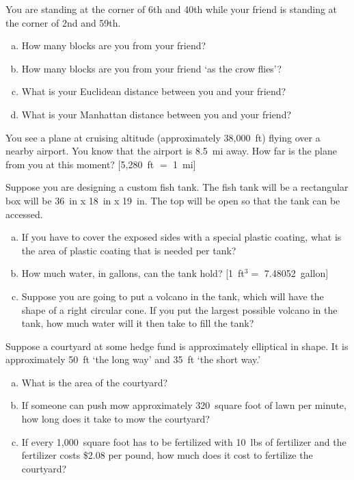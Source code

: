 \documentclass[11pt,letterpaper]{article}
\begin{document}

 You are standing at the corner of 6th and 40th while your friend is standing at the corner of 2nd and 59th.
	\begin{enumerate}[(a)]
	\item How many blocks are you from your friend?
	\item How many blocks are you from your friend `as the crow flies'?
	\item What is your Euclidean distance between you and your friend?
	\item What is your Manhattan distance between you and your friend?
	\end{enumerate}



\newpage



 You see a plane at cruising altitude (approximately 38,000~ft) flying over a nearby airport. You know that the airport is 8.5~mi away. How far is the plane from you at this moment? [5,280~ft $=$ 1~mi]



\newpage



 Suppose you are designing a custom fish tank. The fish tank will be a rectangular box will be 36~in x 18~in x 19~in. The top will be open so that the tank can be accessed. 
	\begin{enumerate}[(a)]
	\item If you have to cover the exposed sides with a special plastic coating, what is the area of plastic coating that is needed per tank?
	\item How much water, in gallons, can the tank hold? [1~ft$^3 =$ 7.48052~gallon]
	\item Suppose you are going to put a volcano in the tank, which will have the shape of a right circular cone. If you put the largest possible volcano in the tank, how much water will it then take to fill the tank?
	\end{enumerate}



\newpage



 Suppose a courtyard at some hedge fund is approximately elliptical in shape. It is approximately 50~ft `the long way' and 35~ft `the short way.'
	\begin{enumerate}[(a)]
	\item What is the area of the courtyard?
	\item If someone can push mow approximately 320~square foot of lawn per minute, how long does it take to mow the courtyard?
	\item If every 1,000~square foot has to be fertilized with 10~lbs of fertilizer and the fertilizer costs \$2.08 per pound, how much does it cost to fertilize the courtyard?
	\end{enumerate}
\end{document}
